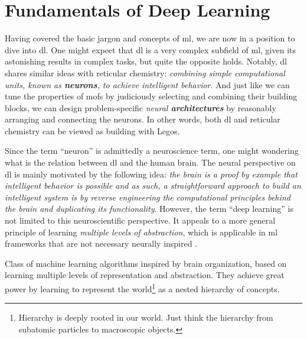 %
%

\section{Fundamentals of Deep Learning}

Having covered the basic jargon and concepts of \gls{ml}, we are now in a
position to dive into \gls{dl}. One might expect that \gls{dl} is a very complex subfield of \gls{ml}, given its astonishing results
in complex tasks, but quite the opposite holds. Notably, \gls{dl} shares similar
ideas with reticular chemistry: \emph{combining simple computational units,
known as \textbf{neurons}, to achieve intelligent
behavior}. And just like we can tune the properties
of \glspl{mof} by judiciously selecting and combining their building blocks, we
can design problem-specific \emph{{neural
\textbf{architectures}}} by reasonably arranging and
connecting the neurons. In other words, both \gls{dl} and reticular
chemistry can be viewed as building with Legos.

Since the term ``neuron'' is admittedly a neuroscience term,
one might wondering what is the relation between \gls{dl}
and the human brain. The neural perspective on \gls{dl} is mainly motivated by
the following idea: \emph{the brain is a proof by example that intelligent
behavior is possible and as such, a straightforward
approach to build an intelligent system is by reverse
engineering the computational principles behind the brain and duplicating its
functionality}. However, the term ``deep learning'' is not limited to this
neuroscientific perspective. It appeals to a more general principle of learning
\emph{multiple levels of abstraction}, which is applicable in \gls{ml}
frameworks that are not necessary neurally inspired \parencite{deeplearning}.

\begin{definition}
	Class of machine learning algorithms inspired by brain organization, based
	on learning multiple levels of representation and abstraction. They achieve
	great power by learning to represent the world\footnote{Hierarchy is deeply
	rooted in our world. Just think the hierarchy from subatomic
	particles to macroscopic
	objects.} as a nested hierarchy of concepts.
\end{definition}

